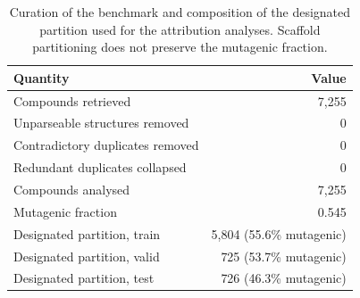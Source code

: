 \begin{table}[htbp]
\centering
\caption{Curation of the benchmark and composition of the designated partition used for the attribution analyses. Scaffold partitioning does not preserve the mutagenic fraction.}
\label{tab:si_data}
\small
\setlength{\tabcolsep}{4pt}
\begin{tabular}{lr}
\toprule
Quantity & Value \\
\midrule
Compounds retrieved & 7,255 \\
Unparseable structures removed & 0 \\
Contradictory duplicates removed & 0 \\
Redundant duplicates collapsed & 0 \\
Compounds analysed & 7,255 \\
Mutagenic fraction & 0.545 \\
Designated partition, train & 5,804 (55.6\% mutagenic) \\
Designated partition, valid & 725 (53.7\% mutagenic) \\
Designated partition, test & 726 (46.3\% mutagenic) \\
\bottomrule
\end{tabular}
\end{table}
